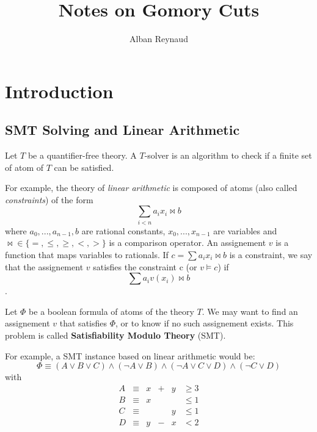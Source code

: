 \documentclass{article}
\title{Notes on Gomory Cuts}
\author{Alban Reynaud}
\date{}
\begin{document}
\maketitle

\begin{abstract}
\end{abstract}

\section{Introduction}
\subsection{SMT Solving and Linear Arithmetic}
Let $T$ be a quantifier-free theory. A $T$-solver is an algorithm to check if a
finite set of atom of $T$ can be satisfied.

For example, the theory of \textit{linear arithmetic} is composed of atoms (also
called \textit{constraints}) of the form
$$\sum_{i < n} a_i x_i \bowtie b$$
where $a_0, ..., a_{n-1}, b$ are rational constants, $x_0, ..., x_{n-1}$ are
variables and $\bowtie \in \{=,\leqslant,\geqslant,<,>\}$ is a comparison
operator. An assignement $v$ is a function that maps variables to rationals.
If $c = \sum a_i x_i \bowtie b$ is a constraint,  we say that the assignement
$v$ satisfies the constraint c (or $v \vDash c$) if
$$\sum a_i v(x_i) \bowtie b$$.

Let $\Phi$ be a boolean formula of atoms of the theory $T$. We may want to find
an assignement $v$ that satisfies $\Phi$, or to know if no such assignement
exists. This problem is called \textbf{Satisfiability Modulo Theory} (SMT).

For example, a SMT instance based on linear arithmetic would be:
$$\Phi \equiv (A \vee B \vee C) \wedge (\neg A \vee B) \wedge
              (\neg A \vee C \vee D) \wedge (\neg C \vee D)$$
with
\begin{displaymath}
\begin{array}{lclccc}
  A & \equiv &x  & + & y & \geqslant 3 \\
  B & \equiv &x  &   &   & \leqslant 1 \\
  C & \equiv &   &   & y & \leqslant 1 \\
  D & \equiv &y  & - & x & < 2         \\
\end{array}
\end{displaymath}
\end{document}
